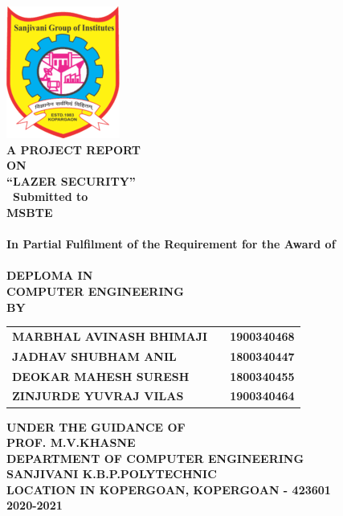 \newpage
\begin{center}
\thispagestyle{empty}
\includegraphics[scale=0.9]{project/images/kbp}\\
\Large{\textbf{A PROJECT REPORT\\ \large{ON}}}\\ [0.3cm]
\LARGE{\textsc {\textbf{\color{blue}``LAZER SECURITY''}}}\\[0.1cm]
\vspace{0.1cm}
\Large{\textbf{\ Submitted to}}
\LARGE{\textbf{\\ MSBTE\\}}
\vspace{0.1cm}
\Large{\textbf{\\In Partial Fulfilment of the Requirement for the Award of\\}}
\Large{\textbf{\\DEPLOMA IN\\\color{magenta}COMPUTER ENGINEERING}}
\vspace{1cm}
\Large{\textbf{\\BY}}\\[0.4cm]
\begin{table}[h]
\centering
\large{
\begin{tabular}{>{\bfseries}lc>{\bfseries}r}
MARBHAL AVINASH BHIMAJI & & 1900340468 \\JADHAV SHUBHAM ANIL & & 1800340447\\DEOKAR MAHESH SURESH & & 1800340455\\ZINJURDE YUVRAJ VILAS & & 1900340464\\
\end{tabular}}
\end{table}
\vspace{0.5cm}
\large{\textbf{UNDER THE GUIDANCE OF}}\\
\large{\textbf{PROF. M.V.KHASNE}}\\
\vspace{1cm}
\large{\textbf{DEPARTMENT OF COMPUTER ENGINEERING}}\\
\Large{\textbf{\color{orange}SANJIVANI K.B.P.POLYTECHNIC}}\\
\large{\textbf{LOCATION IN KOPERGOAN, KOPERGOAN - 423601}}
\LARGE{\textbf{\\ \color{cyan}2020-2021}}\\
\vspace{1cm}

\newpage
\end{center}